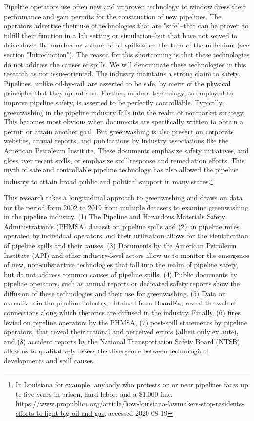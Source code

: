 Pipeline operators use often new and unproven technology to window dress their performance and gain permits for the construction of new pipelines. The operators advertise their use of technologies that are "safe"--that can be proven to fulfill their function in a lab setting or simulation--but that have not served to drive down the number or volume of oil spills since the turn of the millenium (see section "Introduction"). The reason for this shortcoming is that these technologies do not address the causes of spills. We will denominate these technologies in this research as not issue-oriented. The industry maintains a strong claim to safety. Pipelines, unlike oil-by-rail, are asserted to be safe, by merit of the physical principles that they operate on. Further, modern technology, as employed to improve pipeline safety, is asserted to be perfectly controllable. Typically, greenwashing in the pipeline industry falls into the realm of nonmarket strategy. This becomes most obvious when documents are specifically written to obtain a permit or attain another goal. But greenwashing is also present on corporate websites, annual reports, and publications by industry associations like the American Petroleum Institute. These documents emphasize safety initiatives, and gloss over recent spills, or emphasize spill response and remediation efforts. This myth of safe and controllable pipeline technology has also allowed the pipeline industry to attain broad public and political support in many states.\footnote{In Louisiana for example, anybody who protests on or near pipelines faces up to five years in prison, hard labor, and a \$1,000 fine. \url{https://www.propublica.org/article/how-louisiana-lawmakers-stop-residents-efforts-to-fight-big-oil-and-gas}, accessed 2020-08-19}

This research takes a longitudinal approach to greenwashing and draws on data for the period form 2002 to 2019 from multiple datasets to examine greenwashing in the pipeline industry. (1) The Pipeline and Hazardous Materials Safety Administration's (PHMSA) dataset on pipeline spills and (2) on pipeline miles operated by individual operators and their utilization allows for the identification of pipeline spills and their causes. (3) Documents by the American Petroleum Institute (API) and other industry-level actors allow us to monitor the emergence of new, non-substantive technologies that fall into the realm of pipeline safety, but do not address common causes of pipeline spills. (4) Public documents by pipeline operators, such as annual reports or dedicated safety reports show the diffusion of these technologies and their use for greenwashing. (5) Data on executives in the pipeline industry, obtained from BoardEx, reveal the web of connections along which rhetorics are diffused in the industry. Finally, (6) fines levied on pipeline operators by the PHMSA, (7) post-spill statements by pipeline operators, that reveal their rational and perceived errors (albeit only ex ante), and (8) accident reports by the National Transportation Safety Board (NTSB) allow us to qualitatively assess the divergence between technological developments and spill causes.

